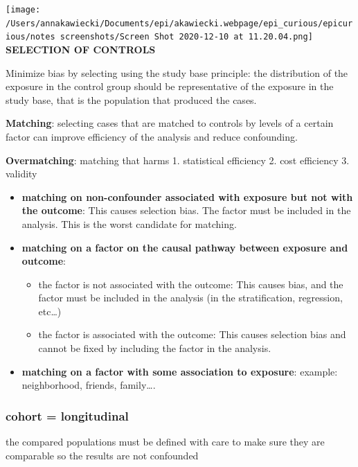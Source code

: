 \documentclass[
]{article}
\providecommand{\tightlist}{%
  \setlength{\itemsep}{0pt}\setlength{\parskip}{0pt}}
\begin{document}
\texttt{[image: /Users/annakawiecki/Documents/epi/akawiecki.webpage/epi\_curious/epicurious/notes screenshots/Screen Shot 2020-12-10 at 11.20.04.png]}
\textbf{SELECTION OF CONTROLS}

Minimize bias by selecting using the study base principle: the
distribution of the exposure in the control group should be
representative of the exposure in the study base, that is the population
that produced the cases.

\textbf{Matching}: selecting cases that are matched to controls by
levels of a certain factor can improve efficiency of the analysis and
reduce confounding.

\textbf{Overmatching}: matching that harms 1. statistical efficiency 2.
cost efficiency 3. validity

\begin{itemize}
\item
  \textbf{matching on non-confounder associated with exposure but not
  with the outcome}: This causes selection bias. The factor must be
  included in the analysis. This is the worst candidate for matching.
\item
  \textbf{matching on a factor on the causal pathway between exposure
  and outcome}:

  \begin{itemize}
  \tightlist
  \item
    the factor is not associated with the outcome: This causes bias, and
    the factor must be included in the analysis (in the stratification,
    regression, etc\ldots)
  \item
    the factor is associated with the outcome: This causes selection
    bias and cannot be fixed by including the factor in the analysis.
  \end{itemize}
\item
  \textbf{matching on a factor with some association to exposure}:
  example: neighborhood, friends, family\ldots.
\end{itemize}

\hypertarget{cohort-longitudinal}{%
\subsubsection{cohort = longitudinal}\label{cohort-longitudinal}}

the compared populations must be defined with care to make sure they are
comparable so the results are not confounded
\end{document}
